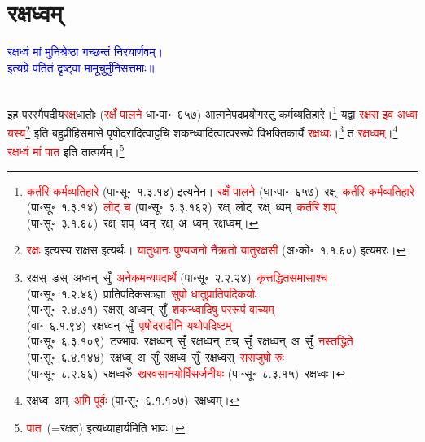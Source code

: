 \section[रक्षध्वम्]{रक्षध्वम्}
\centering\textcolor{blue}{रक्षध्वं मां मुनिश्रेष्ठा गच्छन्तं निरयार्णवम्।\nopagebreak\\
इत्यग्रे पतितं दृष्ट्वा मामूचुर्मुनिसत्तमाः॥}\nopagebreak\\
\\
\fontsize{14}{21}\selectfont\begin{sloppypar}\justifying\noindent\hspace{10mm} इह परस्मैपदीय\-\textcolor{red}{रक्ष्‌}\-धातोः (\textcolor{red}{रक्षँ पालने} धा॰पा॰~६५७) आत्मनेपद\-प्रयोगस्तु कर्म\-व्यतिहारे।\footnote{\textcolor{red}{कर्तरि कर्मव्यतिहारे} (पा॰सू॰~१.३.१४) इत्यनेन। \textcolor{red}{रक्षँ पालने} (धा॰पा॰~६५७)~\arrow रक्ष्~\arrow \textcolor{red}{कर्तरि कर्मव्यतिहारे} (पा॰सू॰~१.३.१४)~\arrow \textcolor{red}{लोट् च} (पा॰सू॰~३.३.१६२)~\arrow रक्ष्~लोट्~\arrow रक्ष्~ध्वम्~\arrow \textcolor{red}{कर्तरि शप्‌} (पा॰सू॰~३.१.६८)~\arrow रक्ष्~शप्~ध्वम्~\arrow रक्ष्~अ~ध्वम्~\arrow रक्षध्वम्।}
यद्वा \textcolor{red}{रक्षस इव अध्वा यस्य}\footnote{\textcolor{red}{रक्षः} इत्यस्य राक्षस इत्यर्थः। \textcolor{red}{यातुधानः पुण्यजनो नैऋतो यातुरक्षसी} (अ॰को॰~१.१.६०) इत्यमरः।}
इति बहुव्रीहि\-समासे पृषोदरादित्वाट्टचि शकन्ध्वादित्वात्पर\-रूपे विभक्तिकार्ये \textcolor{red}{रक्षध्वः}।\footnote{रक्षस्~ङस्~अध्वन्~सुँ~\arrow \textcolor{red}{अनेकमन्यपदार्थे} (पा॰सू॰~२.२.२४)~\arrow \textcolor{red}{कृत्तद्धित\-समासाश्च} (पा॰सू॰~१.२.४६)~\arrow प्रातिपदिक\-सञ्ज्ञा~\arrow \textcolor{red}{सुपो धातु\-प्रातिपदिकयोः} (पा॰सू॰~२.४.७१)~\arrow रक्षस्~अध्वन्~सुँ~\arrow \textcolor{red}{शकन्ध्वादिषु पररूपं वाच्यम्} (वा॰~६.१.९४)~\arrow रक्षध्वन्~सुँ~\arrow \textcolor{red}{पृषोदरादीनि यथोपदिष्टम्} (पा॰सू॰~६.३.१०९)~\arrow टज्भावः~\arrow रक्षध्वन्~सुँ~\arrow रक्षध्वन्~टच्~सुँ~\arrow रक्षध्वन्~अ~सुँ~\arrow \textcolor{red}{नस्तद्धिते} (पा॰सू॰~६.४.१४४)~\arrow रक्षध्व्~अ~सुँ~\arrow रक्षध्व~सुँ~\arrow रक्षध्वस्~\arrow \textcolor{red}{ससजुषो रुः} (पा॰सू॰~८.२.६६)~\arrow रक्षध्वरुँ~\arrow \textcolor{red}{खरवसानयोर्विसर्जनीयः} (पा॰सू॰~८.३.१५)~\arrow रक्षध्वः।} तं \textcolor{red}{रक्षध्वम्}।\footnote{रक्षध्व~अम्~\arrow \textcolor{red}{अमि पूर्वः} (पा॰सू॰~६.१.१०७)~\arrow रक्षध्वम्।
} \textcolor{red}{रक्षध्वं मां पात} इति तात्पर्यम्।\footnote{\textcolor{red}{पात}~({\englishfont =}रक्षत) इत्यध्याहार्यमिति भावः।}\end{sloppypar}
